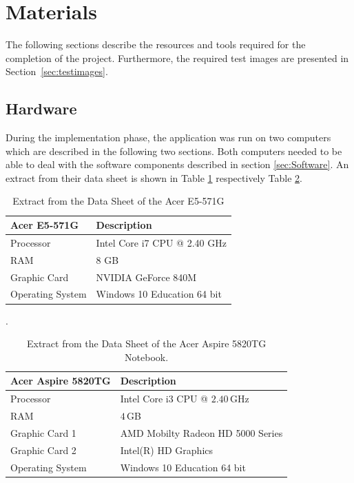 \section{Materials}\label{sec:Materials}

The following sections describe the resources and tools required for the completion of the project. Furthermore, the required test images are presented in Section~\ref{sec:testimages}.


\subsection{Hardware}\label{sec:Hardware}

During the implementation phase, the application was run on two computers which are described in the following two sections. Both computers needed to be able to deal with the software components described in section \ref{sec:Software}. An extract from their data sheet is shown in Table \ref{tab:Computer1} respectively Table \ref{tab:Computer2}.


\begin{table}[H]
	\centering
	\begin{tabular}{|l|l|}
		\hline
		\Absatzbox{}
		\textbf{Acer E5-571G}& \textbf{Description} \\
		\hline
		Processor & Intel Core i7 CPU @ 2.40 GHz\\
		\hline
		RAM & 8 GB  \\
 		\hline 
		Graphic Card & NVIDIA GeForce 840M\\
		\hline
		Operating System &  Windows 10 Education 64 bit   \\
		\hline
	\end{tabular}
	\caption[Extract from the Data Sheet of the Acer E5-571G]{Extract from the Data Sheet of the Acer E5-571G}.
	\label{tab:Computer1}
\end{table}

\begin{table}[H]
	\centering
	\begin{tabular}{|l|l|}
		\hline
		\Absatzbox{}
		\textbf{Acer Aspire 5820TG}& \textbf{Description} \\
		\hline
		Processor & Intel Core i3 CPU @ $2.40\,$GHz \\
		\hline
		RAM & $4\,$GB \\
 		\hline 
		Graphic Card 1 & AMD Mobilty Radeon HD 5000 Series\\
		\hline
		Graphic Card 2 & Intel(R) HD Graphics\\
		\hline
		Operating System & Windows 10 Education 64 bit \\
		\hline
	\end{tabular}
	\caption[Extract from the Data Sheet of the Acer Aspire 5820TG Notebook.]{Extract from the Data Sheet of the Acer Aspire 5820TG Notebook.}
	\label{tab:Computer2}
\end{table}


